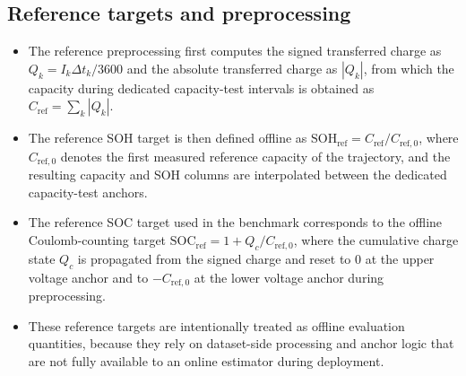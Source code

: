 \documentclass[review,nopreprintline]{elsarticle}
\begin{document}
\subsection{Reference targets and preprocessing}
\begin{itemize}[leftmargin=*]
    \item The reference preprocessing first computes the signed transferred charge as $Q_k = I_k \Delta t_k / 3600$ and the absolute transferred charge as $|Q_k|$, from which the capacity during dedicated capacity-test intervals is obtained as $C_{\mathrm{ref}} = \sum_k |Q_k|$.
    \item The reference SOH target is then defined offline as $\mathrm{SOH}_{\mathrm{ref}} = C_{\mathrm{ref}} / C_{\mathrm{ref},0}$, where $C_{\mathrm{ref},0}$ denotes the first measured reference capacity of the trajectory, and the resulting capacity and SOH columns are interpolated between the dedicated capacity-test anchors.
    \item The reference SOC target used in the benchmark corresponds to the offline Coulomb-counting target $\mathrm{SOC}_{\mathrm{ref}} = 1 + Q_c / C_{\mathrm{ref},0}$, where the cumulative charge state $Q_c$ is propagated from the signed charge and reset to $0$ at the upper voltage anchor and to $-C_{\mathrm{ref},0}$ at the lower voltage anchor during preprocessing.
    \item These reference targets are intentionally treated as offline evaluation quantities, because they rely on dataset-side processing and anchor logic that are not fully available to an online estimator during deployment.
\end{itemize}
\end{document}
